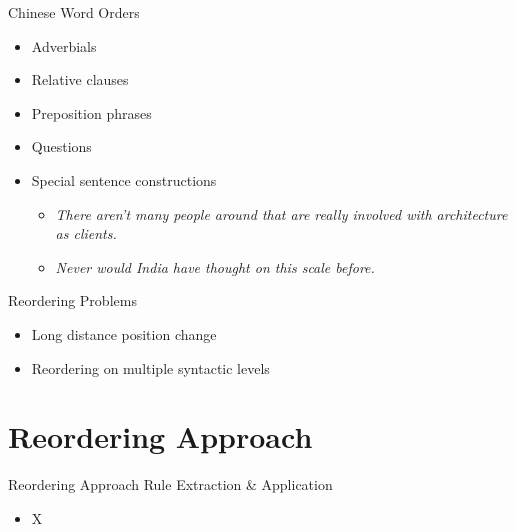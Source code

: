 \documentclass[18pt]{beamer}
\begin{document}
\begin{frame}{Chinese Word Orders}
\begin{itemize}
\item{Adverbials}
\item{Relative clauses}
\item{Preposition phrases}
\item{Questions}
\item{Special sentence constructions}
\begin{itemize}
\item \textit{\alert{There aren't} many people around that are really involved with architecture as clients.}
\item \textit{\alert{Never would} India have thought on this scale before.}
\end{itemize}
\end{itemize}
\end{frame}

\begin{frame}{Reordering Problems}
\begin{itemize}
\item Long distance position change
\item Reordering on multiple syntactic levels
\end{itemize}
\end{frame}


\section{Reordering Approach}
\begin{frame}{Reordering Approach}
Rule Extraction \& Application
\begin{itemize}
\item X
\end{itemize}
\end{frame}
\end{document}
